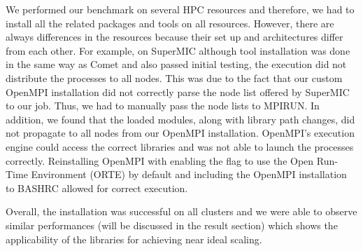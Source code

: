 We performed our benchmark on several HPC resources and therefore, we had to install all the related packages and tools on all resources.
However, there are always differences in the resources because their set up and architectures differ from each other. 
For example, on SuperMIC although tool installation was done in the same way as Comet and also passed initial testing, the execution did not distribute the processes to all nodes. 
This was due to the fact that our custom OpenMPI installation did not correctly parse the node list offered by SuperMIC to our job. 
Thus, we had to manually pass the node lists to MPIRUN. 
In addition, we found that the loaded modules, along with library path changes, did not propagate to all nodes from our OpenMPI installation. 
OpenMPI's execution engine could access the correct libraries and was not able to launch the processes correctly. 
Reinstalling OpenMPI with enabling the flag to use the Open Run-Time Environment (ORTE) by default and including the OpenMPI installation to BASHRC allowed for correct execution.
 
Overall, the installation was successful on all clusters and we were able to observe similar
performances (will be discussed in the result section) which shows the applicability of the 
libraries for achieving near ideal scaling. 

